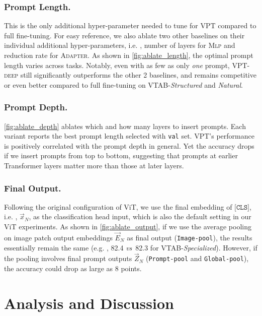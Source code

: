\subsubsection{Prompt Length.} This is the only additional hyper-parameter needed to tune for VPT compared to full fine-tuning. For easy reference, we also ablate two other baselines on their individual additional hyper-parameters, i.e. , number of layers for \textsc{Mlp} and reduction rate for \textsc{Adapter}. As shown in \ref{fig:ablate_length}, the optimal prompt length varies across tasks. Notably, even with as few as only \emph{one} prompt, \textsc{VPT}-\textsc{deep} still significantly outperforms the other 2 baselines, and remains competitive or even better compared to full fine-tuning on VTAB-\textit{Structured} and \textit{Natural}.

\subsubsection{Prompt Depth.}
\ref{fig:ablate_depth} ablates which and how many layers to insert prompts. Each variant reports the best prompt length selected with {\small\texttt{val}} set.
\textsc{VPT}'s performance is positively correlated with the prompt depth in general. Yet the accuracy drops if we insert prompts from \textcolor{prompt_red}{top to bottom}, suggesting that prompts at earlier Transformer layers matter more than those at later layers. 

\subsubsection{Final Output.} Following the original configuration of ViT, we use the final embedding of $\texttt{[CLS]}$, i.e. , $\vec{x}_N$, as the classification head input, which is also the default setting in our ViT experiments. As shown in \ref{fig:ablate_output}, 
if we use the average pooling on image patch output embeddings 
$\vec{E}_N$ as final output (\texttt{Image-pool}), the results essentially remain the same (e.g. , 82.4 \emph{vs}\onedot~82.3 for VTAB-\textit{Specialized}).
However, if the pooling involves final prompt outputs $\vec{Z}_N$ (\texttt{Prompt-pool} and \texttt{Global-pool}), the accuracy could drop as large as 8 points.

\section{Analysis and Discussion}
\label{sec:ana}

